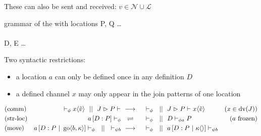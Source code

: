 These can also be sent and received:
$ v \in \mathcal{N} \cup \mathcal{L} $


\begin{JDef}{grammar of the \joincalc with locations}
  P, Q
  \grmr \dots
  \altn {}
  \\ \\
  D, E
  \grmr \dots
  \altn {}
\end{JDef}

Two syntactic restrictions:
\begin{itemize}
  \item a location $a$ can only be defined once in any definition $D$
  \item a defined channel $x$ may only appear in the join patterns of one location
\end{itemize}

\begin{align*}
  \drchamred{comm}{(x \in \dv{J})}{
    \drchamcnf{\phi}{}{\jsnd{x}{\tilde{v}}}
    \drchampar
    \drchamcnf{}{\jrct{J}{P}}{}
  }{
    \drchamcnf{\phi}{}{}
    \drchampar
    \drchamcnf{}{\jrct{J}{P}}{\jsnd{x}{\tilde{v}}}
  }
  \\
  \drchamequ{str-loc}{(a \ \text{frozen)}}{
    \drchamcnf{\phi}{\jloc{a}{D}{P}}{}
  }{
    \drchamcnf{\phi}{}{}
    \drchampar
    \drchamcnf{\phi a}{D}{P}
  }
  \\
  \drchamred{move}{}{
    \drchamcnf{\phi}{\jloc{a}{D}{P \jpar \jgo{b}{\kappa}}}{}
    \drchampar
    \drchamcnf{\psi b}{}{}
  }{
    \drchamcnf{\phi}{}{}
    \drchampar
    \drchamcnf{\psi b}{\jloc{a}{D}{P \jpar \jsnd{\kappa}{}}}{}
  }
\end{align*}

